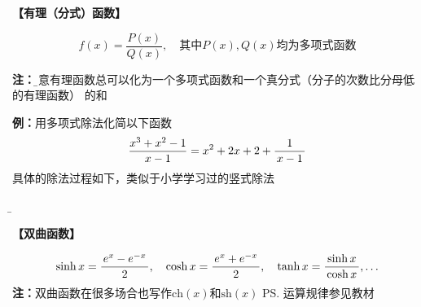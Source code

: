 {\bf 【有理（分式）函数】}

$$f(x)=\frac{P(x)}{Q(x)}, \quad\mbox{其中}P(x),Q(x)\mbox{均为多项式函数}$$
  
{\bf 注：}{\b 任意有理函数总可以化为一个多项式函数和一个真分式（分子的次数比分母低的有理函数）
的和}
	  
{{\bf 例：}用多项式除法化简以下函数}
$$\frac{x^3+x^2-1}{x-1}=x^2+2x+2+\displaystyle\frac{\,{1}\,}{\,{x-1}\,}$$
具体的除法过程如下，类似于小学学习过的竖式除法
\begin{center}
	{\b {}}
\end{center}

{\bf 【双曲函数】}

{\small $$\sinh x =\displaystyle\frac{\,{e^x-e^{-x}}\,}{\,{2}\,}, \quad
\cosh x =\displaystyle\frac{\,{e^x+e^{-x}}\,}{\,{2}\,}, \quad\tanh x=\displaystyle\frac{\,{\sinh
x}\,}{\,{\cosh x}\,}, \ldots$$}
{\bf 注：}双曲函数在很多场合也写作$\mathrm{ch}(x)$和$\mathrm{sh}(x)$
\ps{运算规律参见教材}

